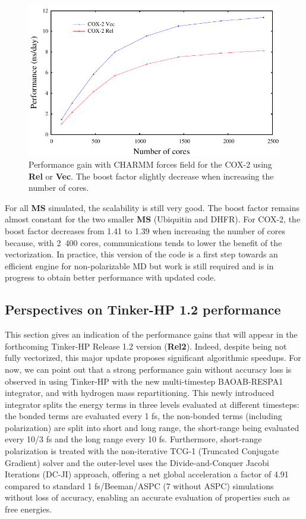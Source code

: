 \documentclass[9pt,comparison]{livecoms}
\begin{document}
\begin{figure}[htb!]
\centering
\includegraphics[scale=0.7]{cox.pdf}
\caption{Performance gain with CHARMM forces field for the COX-2 using \textbf{Rel} or \textbf{Vec}. The boost factor slightly decrease  when increasing the number of cores.}
\label{fig:cox2}
\end{figure}

For all \textbf{MS} simulated, the scalability is still very good. The boost factor remains almost constant for the two smaller \textbf{MS} (Ubiquitin and DHFR). For COX-2, the boost factor decreases from 1.41 to 1.39 when increasing the number of cores because, with 2~400 cores, communications tends to lower the benefit of the vectorization. In practice, this version of the code is a first step towards an efficient engine for non-polarizable MD but work is still required and is in progress to obtain better performance with updated code. 


\subsection{Perspectives on Tinker-HP 1.2 performance} \label{subsection:Perspectives}
\hspace{\parindent}This section gives an indication of the performance gains that will appear in the forthcoming Tinker-HP Release 1.2 version (\textbf{Rel2}). Indeed, despite being not fully vectorized, this major update proposes significant algorithmic speedups.  For now, we can point out that a strong performance gain without accuracy loss is observed in using Tinker-HP with the new multi-timestep BAOAB-RESPA1 integrator\cite{baoab-respa1}, and with hydrogen mass repartitioning.
This newly introduced integrator splits the energy terms in three levels evaluated at different timesteps: the bonded terms are evaluated every 1 fs, the non-bonded terms (including polarization) are split into short and long range, the short-range being evaluated every 10/3 fs and the long range every 10 fs. Furthermore, short-range polarization is treated with the non-iterative TCG-1 (Truncated Conjugate Gradient) solver\cite{aviatjctc2017,aviatjpc2017} and the outer-level uses the Divide-and-Conquer Jacobi Iterations (DC-JI) \cite{Nocito2018} approach, offering a net global acceleration a factor of 4.91 compared to standard 1 fs/Beeman/ASPC (7 without ASPC) simulations without loss of accuracy, enabling an accurate evaluation of properties such as free energies\cite{baoab-respa1}.
\end{document}
